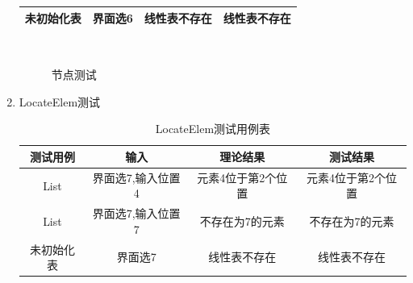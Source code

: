 \documentclass[supercite]{HustGraduPaper}
\theoremstyle{definition}
\begin{document}
\begin{enumerate}
\begin{table}[htb]
\begin{center}
\begin{tabular}{|c|c|c|c|}
				      未初始化表 & 界面选6           & 线性表不存在    & 线性表不存在    \\
				      \hline
			      \end{tabular}
		      \end{center}
	      \end{table}
	      \begin{figure}[htb]
		      \centering
		      \quad
		      \\
		      \caption{节点测试}
	      \end{figure}
	      \newpage
	\item LocateElem测试
	      \begin{table}[htb]
		      \begin{center}
			      \setlength{\tabcolsep}{2.0mm}
			      \caption{LocateElem测试用例表}
			      \label{table6}
			      \begin{tabular}{|c|c|c|c|}
				      \hline
				      测试用例   & 输入              & 理论结果           & 测试结果           \\
				      \hline
				      \hline
				      List       & 界面选7,输入位置4 & 元素4位于第2个位置 & 元素4位于第2个位置 \\
				      \hline
				      List       & 界面选7,输入位置7 & 不存在为7的元素    & 不存在为7的元素    \\
				      \hline
				      未初始化表 & 界面选7           & 线性表不存在       & 线性表不存在       \\
				      \hline
			      \end{tabular}
		      \end{center}

\end{table}
\end{enumerate}
\end{document}

